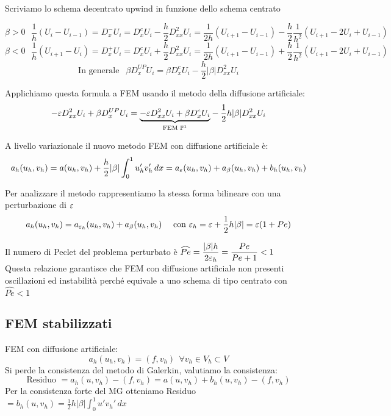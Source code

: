 \documentclass{article}
\begin{document}
Scriviamo lo schema decentrato upwind in funzione dello schema centrato

\[
\beta>0 \ \ \ \frac{1}{h}(U_i-U_{i-1})= D_x^- U_i = D_x^c U_i - \frac{h}{2} D_{xx}^2U_i = \frac{1}{2h} (U_{i+1}-U_{i-1})-\frac{h}{2}\frac{1}{h^2}(U_{i+1}-2U_i+U_{i-1})
\]
\[
\beta<0 \ \ \ \frac{1}{h}(U_{i+1}-U_i)= D_x^+ U_i = D_x^c U_i + \frac{h}{2} D_{xx}^2U_i = \frac{1}{2h} (U_{i+1}-U_{i-1})+\frac{h}{2}\frac{1}{h^2}(U_{i+1}-2U_i+U_{i-1})
\]
\[
\text{In generale } \ \ \beta D_x^{UP}U_i = \beta D_x^c U_i - \frac{h}{2} |\beta| D_{xx}^2 U_i
\]
\phantom{}

Applichiamo questa formula a FEM usando il metodo della diffusione artificiale:
\[
-\varepsilon D_{xx}^2
U_i + \beta D_x^{UP}U_i = \underset{\text{FEM }\mathbb P^1}{\underbrace{-\varepsilon D_{xx}^2 U_i  + \beta D_x^c U_i}} - \dfrac{1}{2}h|\beta|D_{xx}^2 U_i\]
\phantom{}

A livello variazionale il nuovo metodo FEM con diffusione artificiale è:
\[
a_{h}(u_h,v_h)= a(u_h,v_h) + \frac{h}{2}|\beta|\int_0^1 u_h'v_h'\, dx =  a_{\eps}(u_h,v_h)+ a_{\beta}(u_h,v_h) + b_{h}(u_h,v_h)
\]

Per analizzare il metodo rappresentiamo la stessa forma bilineare con una perturbazione di $\varepsilon$
\[
a_{h}(u_h,v_h)=  a_{\varepsilon_h}(u_h,v_h)+ a_{\beta}(u_h,v_h) \ \ \ \text{ con } \varepsilon_h = \varepsilon + \dfrac12 h|\beta| = \varepsilon (1+Pe)
\]

Il numero di Peclet del problema perturbato è $\widehat{Pe}= \dfrac{|\beta|h}{2\varepsilon_h}=\dfrac{Pe}{Pe+1}<1$\\
Questa relazione garantisce che FEM con diffusione artificiale non presenti oscillazioni ed instabilità perché equivale a uno schema di tipo centrato con $\hat{Pe}<1$\\



\subsection{FEM stabilizzati}

FEM con diffusione artificiale:
\[
a_h(u_h,v_h)=(f,v_h) \ \ \forall v_h\in V_h \subset V
\]
Si perde la consistenza del metodo di Galerkin, valutiamo la consistenza:
\[
\text{Residuo } = a_{h}(u,v_h)-(f,v_h)=a(u,v_h) + b_h(u,v_h) - (f,v_h)
\]
Per la consistenza forte del MG otteniamo Residuo $= b_h(u,v_h)=\frac12 h|\beta|\int_0^1 u'v_h'\, dx$\\
\end{document}
